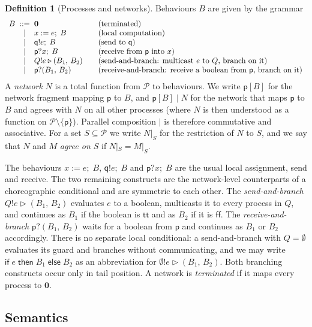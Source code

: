 \documentclass[11pt]{article}
\theoremstyle{plain}
\theoremstyle{definition}
\newtheorem{definition}[theorem]{Definition}
\theoremstyle{remark}
\newcommand{\kw}[1]{\mathsf{#1}}
\newcommand{\kif}{\kw{if}\;}
\newcommand{\kthen}{\;\kw{then}\;}
\newcommand{\kelse}{\;\kw{else}\;}
\newcommand{\nil}{\mathbf{0}}
\newcommand{\ttrue}{\mathsf{tt}}
\newcommand{\ffalse}{\mathsf{ff}}
\newcommand{\seq}{;\;}
\newcommand{\pp}{\mathsf{p}}
\newcommand{\qq}{\mathsf{q}}
\newcommand{\Procs}{\mathcal{P}}
\newcommand{\restr}[2]{#1|_{#2}}
\newcommand{\sendbr}[4]{#1!#2 \mathbin{\triangleright} (#3,\, #4)}
\newcommand{\recvbr}[3]{#1?(#2,\, #3)}
\newcommand{\pif}[3]{\kif #1 \kthen #2 \kelse #3}
\begin{document}
\begin{definition}[Processes and networks]\label{def:net-syntax}
  Behaviours $B$ are given by the grammar
  \[
  \begin{array}{r@{\;\;}c@{\;\;}l@{\qquad}l}
    B & ::= & \nil & \text{(terminated)}\\
      & \mid & x := e \seq B & \text{(local computation)}\\
      & \mid & \qq!e \seq B & \text{(send to $\qq$)}\\
      & \mid & \pp?x \seq B & \text{(receive from $\pp$ into $x$)}\\
      & \mid & \sendbr{Q}{e}{B_1}{B_2} & \text{(send-and-branch: multicast $e$ to $Q$, branch on it)}\\
      & \mid & \recvbr{\pp}{B_1}{B_2} & \text{(receive-and-branch: receive a boolean from $\pp$, branch on it)}
  \end{array}
  \]
  A \emph{network} $N$ is a total function from $\Procs$ to behaviours.  We
  write $\pp[B]$ for the network fragment mapping $\pp$ to $B$, and
  $\pp[B] \mid N$ for the network that maps $\pp$ to $B$ and agrees with $N$
  on all other processes (where $N$ is then understood as a function on
  $\Procs\setminus\{\pp\}$).  Parallel composition $\mid$ is therefore
  commutative and associative.  For a set $S\subseteq\Procs$ we write
  $\restr{N}{S}$ for the restriction of $N$ to $S$, and we say that $N$ and
  $M$ \emph{agree on $S$} if $\restr{N}{S} = \restr{M}{S}$.
\end{definition}

The behaviours $x := e\seq B$, $\qq!e\seq B$ and $\pp?x\seq B$ are the usual
local assignment, send and receive.  The two remaining constructs are the
network-level counterparts of a choreographic conditional and are symmetric
to each other.  The \emph{send-and-branch} $\sendbr{Q}{e}{B_1}{B_2}$ evaluates
$e$ to a boolean, multicasts it to every process in $Q$, and continues as
$B_1$ if the boolean is $\ttrue$ and as $B_2$ if it is $\ffalse$.  The
\emph{receive-and-branch} $\recvbr{\pp}{B_1}{B_2}$ waits for a boolean from
$\pp$ and continues as $B_1$ or $B_2$ accordingly.  There is no separate local
conditional: a send-and-branch with $Q = \emptyset$ evaluates its guard and
branches without communicating, and we may write $\pif{e}{B_1}{B_2}$ as an
abbreviation for $\sendbr{\emptyset}{e}{B_1}{B_2}$.  Both branching constructs
occur only in tail position.  A network is \emph{terminated} if it maps every
process to $\nil$.

\subsection{Semantics}
\end{document}
